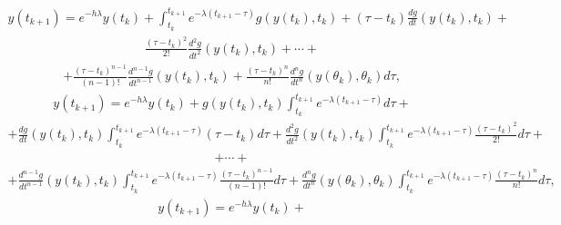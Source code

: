 \documentclass[letterpaper,10pt,english]{jupyterBook}
\begin{document}
\begin{equation*}
\begin{split}
y(t_{k+1}) = e^{-h \lambda}y(t_k) + \int_{t_k}^{t_{k+1}} e^{-\lambda(t_{k+1}-\tau)}  g(y(t_k), t_k) +
(\tau - t_k) \frac{dg}{dt} (y(t_k), t_k) +
\end{split}
\end{equation*}\begin{equation*}
\begin{split}
 \frac{(\tau - t_k)^2}{2!} \frac{d^2g}{dt^2} (y(t_k), t_k) + \dotsi + 
\end{split}
\end{equation*}\begin{equation*}
\begin{split}
 + \frac{(\tau - t_k)^{n-1}}{(n-1)!} \frac{d^{n-1}g}{dt^{n-1}} (y(t_k), t_k) + \frac{(\tau - t_k)^n}{n!} \frac{d^ng}{dt^n} (y(\theta_k), \theta_k)  d\tau,
\end{split}
\end{equation*}\begin{equation*}
\begin{split}
y(t_{k+1}) = e^{-h \lambda}y(t_k) +
g(y(t_k), t_k)\int_{t_k}^{t_{k+1}} e^{-\lambda(t_{k+1}-\tau)} d \tau +
\end{split}
\end{equation*}\begin{equation*}
\begin{split}
+ \frac{dg}{dt}(y(t_k), t_k)\int_{t_k}^{t_{k+1}} e^{-\lambda(t_{k+1}-\tau)} (\tau - t_k)d\tau + \frac{d^2g}{dt^2} (y(t_k), t_k)\int_{t_k}^{t_{k+1}} e^{-\lambda(t_{k+1}-\tau)} \frac{(\tau - t_k)^2}{2!}d\tau +
\end{split}
\end{equation*}\begin{equation*}
\begin{split}
+ \dotsi +
\end{split}
\end{equation*}\begin{equation*}
\begin{split}
+ \frac{d^{n-1}g}{dt^{n-1}} (y(t_k), t_k)\int_{t_k}^{t_{k+1}}  e^{-\lambda(t_{k+1}-\tau)} \frac{(\tau - t_k)^{n-1}}{(n-1)!} d\tau + \frac{d^ng}{dt^n} (y(\theta_k), \theta_k) \int_{t_k}^{t_{k+1}}  e^{-\lambda(t_{k+1}-\tau)} \frac{(\tau - t_k)^n}{n!} d\tau,
\end{split}
\end{equation*}\begin{equation*}
\begin{split}
y(t_{k+1}) = e^{-h \lambda}y(t_k) +

\end{split}
\end{equation*}
\end{document}
